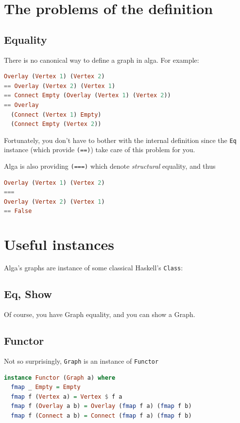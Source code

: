 \documentclass[10pt,a4paper]{article}
\begin{document}
\section{The problems of the definition}
\subsection{Equality}
There is no canonical way to define a graph in alga. For example:
\begin{lstlisting}[language=Haskell, frame=single]
Overlay (Vertex 1) (Vertex 2)
== Overlay (Vertex 2) (Vertex 1)
== Connect Empty (Overlay (Vertex 1) (Vertex 2))
== Overlay 
  (Connect (Vertex 1) Empty)
  (Connect Empty (Vertex 2))
\end{lstlisting}
 
Fortunately, you don't have to bother with the internal definition since the \verb|Eq| instance (which provide \verb|(==)|) take care of this problem for you.

Alga is also providing \verb|(===)| which denote \emph{structural} equality, and thus
 
\begin{lstlisting}[language=Haskell, frame=single]
Overlay (Vertex 1) (Vertex 2)
===
Overlay (Vertex 2) (Vertex 1)
== False
\end{lstlisting}
 
\section{Useful instances}
Alga's graphs are instance of some classical Haskell's \verb|Class|:

\subsection{Eq, Show}
Of course, you have Graph equality, and you can show a Graph.

\subsection{Functor}
Not so surprisingly, \verb|Graph| is an instance of \verb|Functor|
\begin{lstlisting}[language=Haskell, frame=single]
instance Functor (Graph a) where
  fmap _ Empty = Empty
  fmap f (Vertex a) = Vertex $ f a
  fmap f (Overlay a b) = Overlay (fmap f a) (fmap f b)
  fmap f (Connect a b) = Connect (fmap f a) (fmap f b)
\end{lstlisting}
 
\end{document}
